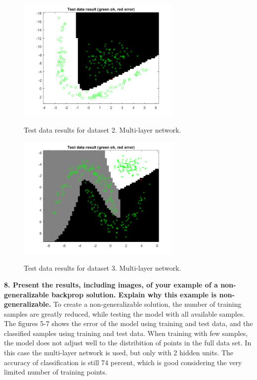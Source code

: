 \documentclass[twocolumn]{report}
\begin{document}
	\begin{figure}[h]
		\includegraphics[width=8cm]{../multi_set2.png}
		\label{img:testset1}
		\caption{Test data results for dataset 2. Multi-layer network.}
	\end{figure}
	
	\begin{figure}[h]
		\includegraphics[width=8cm]{../multi_set3.png}
		\label{img:testset1}
		\caption{Test data results for dataset 3. Multi-layer network.}
	\end{figure}
	
	\textbf{8. Present the results, including images, of your example of a non-generalizable backprop solution. Explain why this example is non-generalizable.}
	To create a non-generalizable solution, the number of training samples are greatly 	reduced, while testing the model with all available samples. The figures 5-7 shows the error of the model using training and test data, and the classified samples using training and test data. When training with few samples, the model does not adjust well to the distribition of points in the full data set. In this case the multi-layer network is used, but only with 2 hidden units. The accuracy of classification is still 74 percent, which is good considering the very limited number of training points. \\
	
\end{document}
